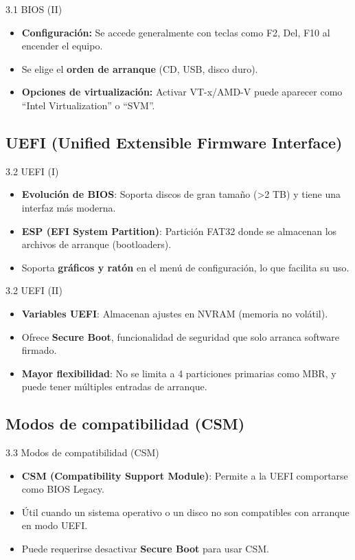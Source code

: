 \documentclass{beamer}
\begin{document}
\begin{frame}{3.1 BIOS (II)}
    \begin{itemize}
        \item \textbf{Configuración:} Se accede generalmente con teclas como F2, Del, F10 al encender el equipo.
        \item Se elige el \textbf{orden de arranque} (CD, USB, disco duro).
        \item \textbf{Opciones de virtualización:} Activar VT-x/AMD-V puede aparecer como “Intel Virtualization” o “SVM”.
    \end{itemize}
\end{frame}

\subsection{UEFI (Unified Extensible Firmware Interface)}
\begin{frame}{3.2 UEFI (I)}
    \begin{itemize}
        \item \textbf{Evolución de BIOS}: Soporta discos de gran tamaño (>2 TB) y tiene una interfaz más moderna.
        \item \textbf{ESP (EFI System Partition)}: Partición FAT32 donde se almacenan los archivos de arranque (bootloaders).
        \item Soporta \textbf{gráficos y ratón} en el menú de configuración, lo que facilita su uso.
    \end{itemize}
\end{frame}

\begin{frame}{3.2 UEFI (II)}
    \begin{itemize}
        \item \textbf{Variables UEFI}: Almacenan ajustes en NVRAM (memoria no volátil).
        \item Ofrece \textbf{Secure Boot}, funcionalidad de seguridad que solo arranca software firmado.
        \item \textbf{Mayor flexibilidad}: No se limita a 4 particiones primarias como MBR, y puede tener múltiples entradas de arranque.
    \end{itemize}
\end{frame}

\subsection{Modos de compatibilidad (CSM)}
\begin{frame}{3.3 Modos de compatibilidad (CSM)}
    \begin{itemize}
        \item \textbf{CSM (Compatibility Support Module)}: Permite a la UEFI comportarse como BIOS Legacy.
        \item Útil cuando un sistema operativo o un disco no son compatibles con arranque en modo UEFI.
        \item Puede requerirse desactivar \textbf{Secure Boot} para usar CSM.
    \end{itemize}
\end{frame}
\end{document}
